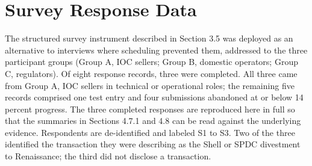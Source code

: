 \hypertarget{survey-response-data}{%
\chapter{Survey Response Data}\label{survey-response-data}}

The structured survey instrument described in Section 3.5 was deployed
as an alternative to interviews where scheduling prevented them,
addressed to the three participant groups (Group A, IOC sellers; Group
B, domestic operators; Group C, regulators). Of eight response records,
three were completed. All three came from Group A, IOC sellers in
technical or operational roles; the remaining five records comprised one
test entry and four submissions abandoned at or below 14 percent
progress. The three completed responses are reproduced here in full so
that the summaries in Sections 4.7.1 and 4.8 can be read against the
underlying evidence. Respondents are de-identified and labeled S1 to S3.
Two of the three identified the transaction they were describing as the
Shell or SPDC divestment to Renaissance; the third did not disclose a
transaction.

